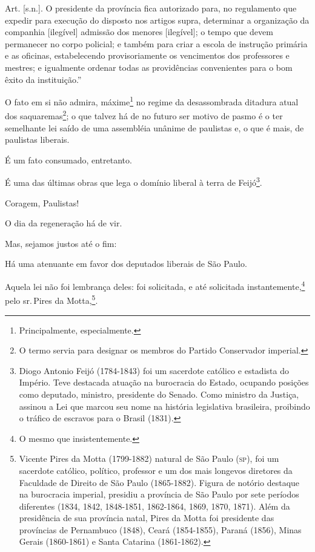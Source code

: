 Art. {[}s.n.{]}. O presidente da província fica autorizado para, no
regulamento que expedir para execução do disposto nos artigos supra,
determinar a organização da companhia {[}ilegível{]} admissão dos
menores {[}ilegível{]}; o tempo que devem permanecer no corpo policial;
e também para criar a escola de instrução primária e as oficinas,
estabelecendo provisoriamente os vencimentos dos professores e mestres;
e igualmente ordenar todas as providências convenientes para o bom êxito
da instituição.''

O fato em si não admira, máxime\footnote{Principalmente,
  especialmente.} no regime da desassombrada ditadura atual dos
saquaremas\footnote{O termo servia para designar os membros do Partido
  Conservador imperial.}; o que talvez há de no futuro ser motivo de
pasmo é o ter semelhante lei saído de uma assembléia unânime de
paulistas e, o que é mais, de paulistas liberais.

É um fato consumado, entretanto.

É uma das últimas obras que lega o domínio liberal à terra de
Feijó\footnote{Diogo Antonio Feijó (1784-1843) foi um sacerdote
  católico e estadista do Império. Teve destacada atuação na burocracia
  do Estado, ocupando posições como deputado, ministro, presidente do
  Senado. Como ministro da Justiça, assinou a Lei que marcou seu nome na
  história legislativa brasileira, proibindo o tráfico de escravos para
  o Brasil (1831).}.

Coragem, Paulistas!

O dia da regeneração há de vir.

\noindent\dotfill

Mas, sejamos justos até o fim:

Há uma atenuante em favor dos deputados liberais de São Paulo.

Aquela lei não foi lembrança deles: foi solicitada, e até solicitada
instantemente,\footnote{O mesmo que insistentemente.} pelo sr.\,Pires
da Motta,\footnote{Vicente Pires da Motta (1799-1882) natural de São
  Paulo (\textsc{sp}), foi um sacerdote católico, político, professor e um dos
  mais longevos diretores da Faculdade de Direito de São Paulo
  (1865-1882). Figura de notório destaque na burocracia imperial,
  presidiu a província de São Paulo por sete períodos diferentes (1834,
  1842, 1848-1851, 1862-1864, 1869, 1870, 1871). Além da presidência de
  sua província natal, Pires da Motta foi presidente das províncias de
  Pernambuco (1848), Ceará (1854-1855), Paraná (1856), Minas Gerais
  (1860-1861) e Santa Catarina (1861-1862).}.

